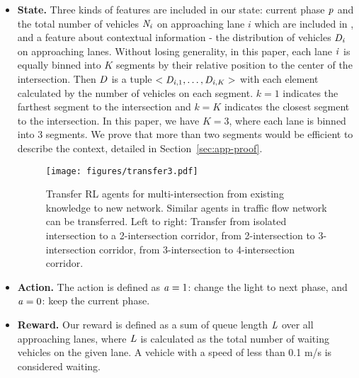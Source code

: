 \begin{itemize}[wide,noitemsep,topsep=0pt]
\item \textbf{State.}  Three kinds of features are included in our state: current phase $\mathit{p}$ and the total number of vehicles $\mathit{N}_\mathit{i}$ on approaching lane $i$ which are included in \cite{wei2018intellilight}, and a feature about contextual information - the distribution of vehicles $\mathit{D}_\mathit{i}$ on approaching lanes. Without losing generality, in this paper, each lane $\mathit{i}$ is equally binned into $K$ segments by their relative position to the center of the intersection. Then $\mathit{D}$ is a tuple $<\mathit{D}_{\mathit{i},1},\dots, \mathit{D}_{\mathit{i},K}>$ with each element calculated by the number of vehicles on each segment. $k= 1$ indicates the farthest segment to the intersection and $k = K$ indicates the closest segment to the intersection. 
In this paper, we have $K=3$, where each lane is binned into 3 segments. We prove that more than two segments would be efficient to describe the context, detailed in Section~\ref{sec:app-proof}. 

\begin{figure*}[t!]
  \centering
   \texttt{[image: figures/transfer3.pdf]}
    \caption{Transfer RL agents for multi-intersection from existing knowledge to new network. Similar agents in traffic flow network can be transferred. Left to right: Transfer from isolated intersection to a  2-intersection corridor, from 2-intersection to 3-intersection corridor, from 3-intersection to 4-intersection corridor.}
   \label{fig:transfer}
\end{figure*}


\item \textbf{Action.} The action is defined as $\mathit{a}=1$: change the light to next phase, and $\mathit{a} = 0$: keep the current phase.


\item \textbf{Reward.} Our reward is defined as a sum of queue length $\mathit{L}$ over all approaching lanes, where
$\mathit{L}$ is calculated as the total number of waiting vehicles on the given lane. A vehicle with a speed of less than 0.1 m/s is considered waiting.
\end{itemize}

